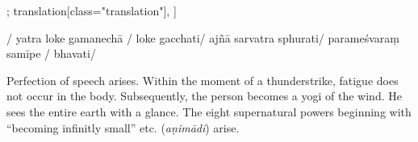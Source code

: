 \begin{alignment}[
  texts=edition[class="edition"];
  translation[class="translation"],
  ]
\begin{edition}
\begin{prose}[p42_03]
{  
  }
/
yatra loke gamanechā
/
loke gacchati/
ajñā sarvatra sphurati/
parameśvaraṃ samīpe
/
bhavati/
\end{prose}
  \end{edition}
  \begin{translation}
    \begin{tlate}[p42_02]
      \noindent
      Perfection of speech arises. Within the moment of a thunderstrike, fatigue does not occur in the body. Subsequently, the person becomes a yogi of the wind. He sees the entire earth with a glance. The eight supernatural powers beginning with ``becoming infinitly small'' etc. (\textit{aṇimādi}) arise.
    \end{tlate}
    \begin{tlate}[42_1]

\end{tlate}
\end{translation}
\end{alignment}

